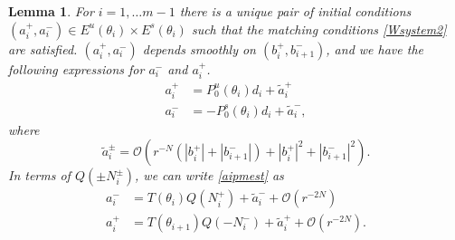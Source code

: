 \documentclass[12pt]{elsarticle}
\newtheorem{lemma}{Lemma}
\begin{document}
\begin{lemma}\label{inv2}
For $i = 1, \dots m-1$ there is a unique pair of initial conditions $(a_i^+, a_i^-) \in E^u(\theta_i) \times E^s(
\theta_i)$ such that the matching conditions \cref{Wsystem2} are satisfied. $(a_i^+, a_i^-)$ depends smoothly on $(b_i^+, b_{i+1}^-)$, and we have the following expressions for $a_i^-$ and $a_i^+$. 
\begin{equation}\label{aipmest}
\begin{aligned}
a_i^+ &= P_0^u(\theta_i) d_i + \tilde{a}_i^+ \\
a_i^- &= -P_0^s(\theta_i) d_i + \tilde{a}_i^- ,
\end{aligned}
\end{equation}
where 
\begin{equation}\label{tildeaest}
\tilde{a}_i^\pm = \mathcal{O}(r^{-N}(|b_i^+|+|b_{i+1}^-|) + |b_i^+|^2+|b_{i+1}^-|^2) .
\end{equation}
In terms of $Q(\pm N_i^\pm)$, we can write \cref{aipmest} as 
\begin{equation}\label{aipmexp}
\begin{aligned}
a_i^- &= T(\theta_i) Q(N_i^+) + \tilde{a}_i^- + \mathcal{O}(r^{-2N}) \\
a_i^+ &= T(\theta_{i+1}) Q(-N_i^-) + \tilde{a}_i^+ + \mathcal{O}(r^{-2N}).
\end{aligned}
\end{equation}


\end{lemma}
\end{document}
